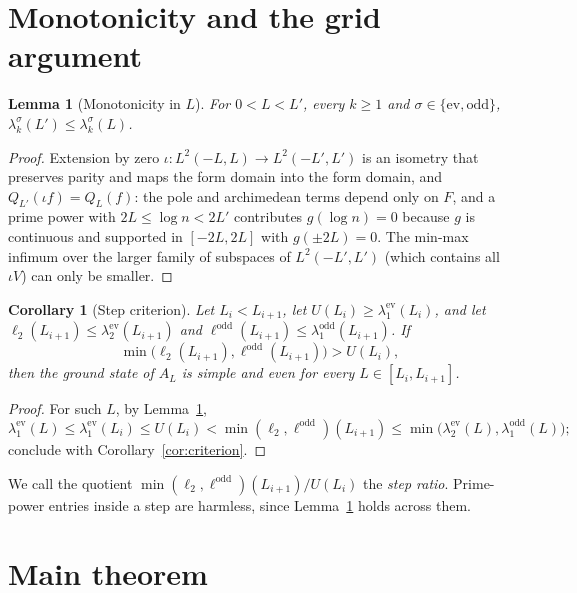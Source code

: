\documentclass[11pt]{amsart}
\newcommand{\ev}{\mathrm{ev}}
\newcommand{\od}{\mathrm{odd}}
\newtheorem{lemma}[theorem]{Lemma}
\newtheorem{corollary}[theorem]{Corollary}
\theoremstyle{definition}
\theoremstyle{remark}
\numberwithin{equation}{section}
\begin{document}
\section{Monotonicity and the grid argument}\label{sec:mono}

\begin{lemma}[Monotonicity in $L$]\label{lem:mono}
For $0<L<L'$, every $k\ge1$ and $\sigma\in\{\ev,\od\}$, $\lambda_k^\sigma(L')\le\lambda_k^\sigma(L)$.
\end{lemma}
\begin{proof}
Extension by zero $\iota:L^2(-L,L)\to L^2(-L',L')$ is an isometry that preserves parity and maps the form domain into the form domain, and $Q_{L'}(\iota f)=Q_L(f)$: the pole and archimedean terms depend only on $F$, and a prime power with $2L\le\log n<2L'$ contributes $g(\log n)=0$ because $g$ is continuous and supported in $[-2L,2L]$ with $g(\pm2L)=0$. The min-max infimum over the larger family of subspaces of $L^2(-L',L')$ (which contains all $\iota V$) can only be smaller.
\end{proof}

\begin{corollary}[Step criterion]\label{cor:step}
Let $L_i<L_{i+1}$, let $U(L_i)\ge\lambda_1^\ev(L_i)$, and let $\ell_2(L_{i+1})\le\lambda_2^\ev(L_{i+1})$ and $\ell^\od(L_{i+1})\le\lambda_1^\od(L_{i+1})$. If
\begin{equation}\label{eq:step}
\min\bigl(\ell_2(L_{i+1}),\ell^\od(L_{i+1})\bigr)>U(L_i),
\end{equation}
then the ground state of $A_L$ is simple and even for every $L\in[L_i,L_{i+1}]$.
\end{corollary}
\begin{proof}
For such $L$, by Lemma~\ref{lem:mono},
\[
\lambda_1^\ev(L)\le\lambda_1^\ev(L_i)\le U(L_i)<\min(\ell_2,\ell^\od)(L_{i+1})\le\min\bigl(\lambda_2^\ev(L),\lambda_1^\od(L)\bigr);
\]
conclude with Corollary~\ref{cor:criterion}.
\end{proof}

We call the quotient $\min(\ell_2,\ell^\od)(L_{i+1})/U(L_i)$ the \emph{step ratio}. Prime-power entries inside a step are harmless, since Lemma~\ref{lem:mono} holds across them.

\section{Main theorem}\label{sec:main}
\end{document}
